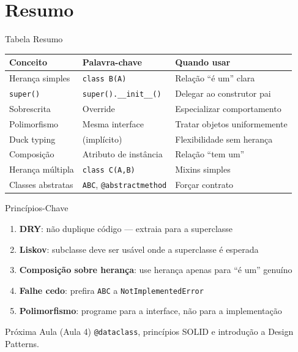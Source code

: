 \documentclass[aspectratio=169]{beamer}
\begin{document}
\section{Resumo}

\begin{frame}{Tabela Resumo}
  \begin{center}
    \small
    \begin{tabular}{llp{6cm}}
      \toprule
      \textbf{Conceito} & \textbf{Palavra-chave} & \textbf{Quando usar} \\
      \midrule
      Herança simples   & \texttt{class B(A)} & Relação ``é um'' clara \\
      \texttt{super()}  & \texttt{super().\_\_init\_\_()} & Delegar ao construtor pai \\
      Sobrescrita       & Override             & Especializar comportamento \\
      Polimorfismo      & Mesma interface      & Tratar objetos uniformemente \\
      Duck typing       & (implícito)          & Flexibilidade sem herança \\
      Composição        & Atributo de instância & Relação ``tem um'' \\
      Herança múltipla  & \texttt{class C(A,B)} & Mixins simples \\
      Classes abstratas & \texttt{ABC}, \texttt{@abstractmethod} & Forçar contrato \\
      \bottomrule
    \end{tabular}
  \end{center}
\end{frame}

\begin{frame}{Princípios-Chave}
  \begin{enumerate}
    \item \textbf{DRY}: não duplique código — extraia para a superclasse
    \item \textbf{Liskov}: subclasse deve ser usável onde a superclasse é esperada
    \item \textbf{Composição sobre herança}: use herança apenas para ``é um'' genuíno
    \item \textbf{Falhe cedo}: prefira \texttt{ABC} a \texttt{NotImplementedError}
    \item \textbf{Polimorfismo}: programe para a interface, não para a implementação
  \end{enumerate}

  \bigskip

  \begin{exampleblock}{Próxima Aula (Aula 4)}
    \texttt{@dataclass}, princípios SOLID e introdução a Design Patterns.
  \end{exampleblock}
\end{frame}
\end{document}
